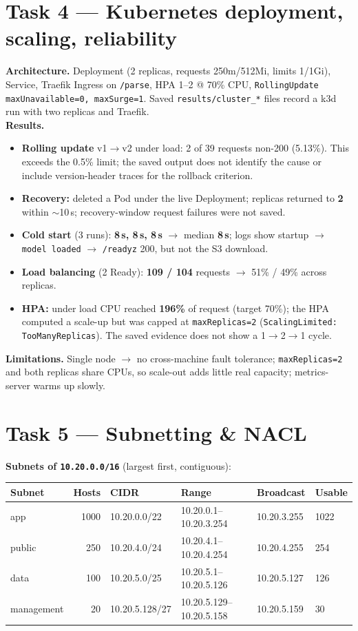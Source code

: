 \documentclass[10pt,a4paper]{article}
\newcommand{\code}[1]{\texttt{\small #1}}
\begin{document}
\section{Task 4 --- Kubernetes deployment, scaling, reliability}
\textbf{Architecture.} Deployment (2 replicas, requests 250m/512Mi, limits 1/1Gi), Service, Traefik Ingress
on \code{/parse}, HPA 1--2 @ 70\% CPU, \code{RollingUpdate maxUnavailable=0, maxSurge=1}. Saved
\code{results/cluster_*} files record a k3d run with two replicas and Traefik.\\
\textbf{Results.}
\begin{itemize}
\item \textbf{Rolling update} v1$\rightarrow$v2 under load: 2 of 39 requests non-200 (5.13\%).
This exceeds the 0.5\% limit; the saved output does not identify the cause or include version-header
traces for the rollback criterion.
\item \textbf{Recovery:} deleted a Pod under the live Deployment; replicas returned to \textbf{2} within
$\sim$10\,s; recovery-window request failures were not saved.
\item \textbf{Cold start} (3 runs): \textbf{8\,s, 8\,s, 8\,s} $\rightarrow$ median \textbf{8\,s}; logs show
startup $\rightarrow$ \code{model loaded} $\rightarrow$ \code{/readyz} 200, but not the S3 download.
\item \textbf{Load balancing} (2 Ready): \textbf{109 / 104} requests $\rightarrow$ 51\% / 49\% across replicas.
\item \textbf{HPA:} under load CPU reached \textbf{196\%} of request (target 70\%); the HPA computed a
scale-up but was capped at \code{maxReplicas=2} (\code{ScalingLimited: TooManyReplicas}). The saved
evidence does not show a 1$\rightarrow$2$\rightarrow$1 cycle.
\end{itemize}
\textbf{Limitations.} Single node $\rightarrow$ no cross-machine fault tolerance; \code{maxReplicas=2} and
both replicas share CPUs, so scale-out adds little real capacity; metrics-server warms up slowly.

\section{Task 5 --- Subnetting \& NACL}
\textbf{Subnets of \code{10.20.0.0/16}} (largest first, contiguous):

\begin{center}\small
\begin{tabular}{lrllll}
\toprule
Subnet & Hosts & CIDR & Range & Broadcast & Usable \\
\midrule
app & 1000 & 10.20.0.0/22 & 10.20.0.1--10.20.3.254 & 10.20.3.255 & 1022 \\
public & 250 & 10.20.4.0/24 & 10.20.4.1--10.20.4.254 & 10.20.4.255 & 254 \\
data & 100 & 10.20.5.0/25 & 10.20.5.1--10.20.5.126 & 10.20.5.127 & 126 \\
management & 20 & 10.20.5.128/27 & 10.20.5.129--10.20.5.158 & 10.20.5.159 & 30 \\
\bottomrule
\end{tabular}
\end{center}
\end{document}
